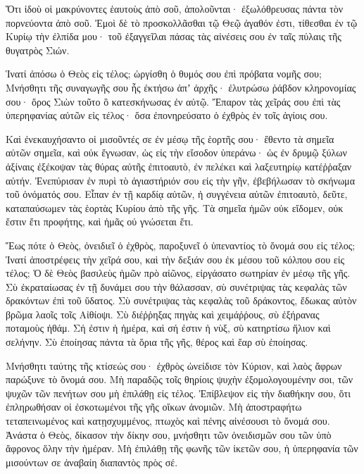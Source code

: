 \begin{spacing}{1.1}
\begin{multicols}{2}
Ὅτι ἰδοὺ οἱ μακρύνοντες ἑαυτοὺς ἀπὸ σοῦ, ἀπολοῦνται· ἐξωλόθρευσας πάντα τὸν πορνεύοντα ἀπὸ σοῦ.
Ἐμοὶ δὲ τὸ προσκολλᾶσθαι τῷ Θεῷ ἀγαθόν ἐστι, τίθεσθαι ἐν τῷ Κυρίῳ τὴν ἐλπίδα μου· τοῦ ἐξαγγεῖλαι πάσας τὰς αἰνέσεις σου ἐν ταῖς πύλαις τῆς θυγατρὸς Σιών.

Ἱνατί ἀπόσω ὁ Θεὸς εἰς τέλος; ὠργίσθη ὁ θυμός σου ἐπὶ πρόβατα νομῆς σου;
Μνήσθητι τῆς συναγωγῆς σου ἧς ἐκτήσω ἀπʼ ἀρχῆς· ἐλυτρώσω ῥάβδον κληρονομίας σου· ὄρος Σιὼν τοῦτο ὃ κατεσκήνωσας ἐν αὐτῷ.
Ἔπαρον τὰς χεῖράς σου ἐπὶ τὰς ὑπερηφανίας αὐτῶν εἰς τέλος· ὅσα ἐπονηρεύσατο ὁ ἐχθρὸς ἐν τοῖς ἁγίοις σου.

Καὶ ἐνεκαυχήσαντο οἱ μισοῦντές σε ἐν μέσῳ τῆς ἑορτῆς σου·
ἔθεντο τὰ σημεῖα αὐτῶν σημεῖα, καὶ οὐκ ἔγνωσαν, ὡς εἰς τὴν εἴσοδον ὑπεράνω· ὡς ἐν δρυμῷ ξύλων ἀξίναις ἐξέκοψαν
τὰς θύρας αὐτῆς ἐπιτοαυτὸ, ἐν πελέκει καὶ λαξευτηρίῳ κατέῤῥαξαν αὐτήν.
Ἐνεπύρισαν ἐν πυρὶ τὸ ἁγιαστήριόν σου εἰς τὴν γῆν, ἐβεβήλωσαν τὸ σκήνωμα τοῦ ὀνόματός σου.
Εἶπαν ἐν τῇ καρδίᾳ αὐτῶν, ἡ συγγένεια αὐτῶν ἐπιτοαυτὸ, δεῦτε, καταπαύσωμεν τὰς ἑορτὰς Κυρίου ἀπὸ τῆς γῆς.
Τὰ σημεῖα ἡμῶν οὐκ εἴδομεν, οὐκ ἔστιν ἔτι προφήτης, καὶ ἡμᾶς οὐ γνώσεται ἔτι.

Ἕως πότε ὁ Θεὸς, ὀνειδιεῖ ὁ ἐχθρὸς, παροξυνεῖ ὁ ὑπεναντίος τὸ ὄνομά σου εἰς τέλος;
Ἱνατί ἀποστρέφεις τὴν χεῖρά σου, καὶ τὴν δεξιάν σου ἐκ μέσου τοῦ κόλπου σου εἰς τέλος;
Ὁ δὲ Θεὸς βασιλεὺς ἡμῶν πρὸ αἰῶνος, εἰργάσατο σωτηρίαν ἐν μέσῳ τῆς γῆς.
Σὺ ἐκραταίωσας ἐν τῇ δυνάμει σου τὴν θάλασσαν, σὺ συνέτριψας τὰς κεφαλὰς τῶν δρακόντων ἐπὶ τοῦ ὕδατος. Σὺ συνέτριψας τὰς κεφαλὰς τοῦ δράκοντος,
ἔδωκας αὐτὸν βρῶμα λαοῖς τοῖς Αἰθίοψι.
Σὺ διέῤῥηξας πηγὰς καὶ χειμάῤῥους, σὺ ἐξήρανας ποταμοὺς ἠθάμ.
Σή ἐστιν ἡ ἡμέρα, καὶ σή ἐστιν ἡ νὺξ, σὺ κατηρτίσω ἥλιον καὶ σελήνην.
Σὺ ἐποίησας πάντα τὰ ὅρια τῆς γῆς, θέρος καὶ ἔαρ σὺ ἐποίησας.

Μνήσθητι ταύτης τῆς κτίσεώς σου· ἐχθρὸς ὠνείδισε τὸν Κύριον, καὶ λαὸς ἄφρων παρώξυνε τὸ ὄνομά σου.
Μὴ παραδῷς τοῖς θηρίοις ψυχὴν ἐξομολογουμένην σοι, τῶν ψυχῶν τῶν πενήτων σου μὴ ἐπιλάθῃ εἰς τέλος.
Ἐπίβλεψον εἰς τὴν διαθήκην σου, ὅτι ἐπληρωθήσαν οἱ ἐσκοτωμένοι τῆς γῆς οἴκων ἀνομιῶν.
Μὴ ἀποστραφήτω τεταπεινωμένος καὶ κατῃσχυμμένος, πτωχὸς καὶ πένης αἰνέσουσι τὸ ὄνομά σου.
Ἀνάστα ὁ Θεὸς, δίκασον τὴν δίκην σου, μνήσθητι τῶν ὀνειδισμῶν σου τῶν ὑπὸ ἄφρονος ὅλην τὴν ἡμέραν.
Μὴ ἐπιλάθῃ τῆς φωνῆς τῶν ἱκετῶν σου, ἡ ὑπερηφανία τῶν μισούντων σε ἀναβαίη διαπαντὸς πρὸς σέ.


\end{multicols}
\end{spacing}
